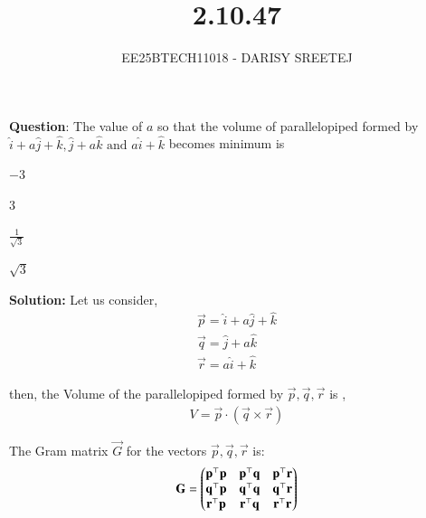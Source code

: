 \documentclass[journal]{IEEEtran}
\begin{document}

\vspace{3cm}

\title{2.10.47}
\author{EE25BTECH11018 - DARISY SREETEJ}
{\let\newpage\relax\maketitle}

\renewcommand{\thefigure}{\theenumi}
\renewcommand{\thetable}{\theenumi}
\setlength{\intextsep}{10pt} %


\renewcommand{\thetable}{\theenumi}


\textbf{Question}:
The value of $a$ so that the volume of parallelopiped formed by $\hat{i} + a\hat{j} + \hat{k}, \hat{j} + a\hat{k} \text{ and } a\hat{i} + \hat{k}$ becomes minimum is
\begin{enumerate}
\begin{multicols}{4}
\item $-3$
\item $3$
\item $\frac{1}{\sqrt{3}}$
\item $\sqrt{3}$
\end{multicols}
\end{enumerate}
\textbf{Solution:}
Let us consider,
\begin{align*}
\vec{p}=\hat{i}+a\hat{j}+\hat{k}\\
\vec{q}=\hat{j}+a\hat{k}\\
\vec{r}=a\hat{i}+\hat{k}
\end{align*}

then, the Volume of the parallelopiped formed by $\vec{p},\vec{q},\vec{r}$ is ,
\begin{align}
    V = \vec{p}\cdot(\vec{q}\times\vec{r})
\end{align}

The Gram matrix $\vec{G} $ for the vectors $ \vec{p}, \vec{q}, \vec{r} $ is:
\begin{align}
\mathbf{G} = \begin{pmatrix}
\mathbf{p}^\top \mathbf{p} & \mathbf{p}^\top \mathbf{q} & \mathbf{p}^\top \mathbf{r} \\
\mathbf{q}^\top \mathbf{p} & \mathbf{q}^\top \mathbf{q} & \mathbf{q}^\top \mathbf{r} \\
\mathbf{r}^\top \mathbf{p} & \mathbf{r}^\top \mathbf{q} & \mathbf{r}^\top \mathbf{r}
\end{pmatrix}
\end{align}
\end{document}
